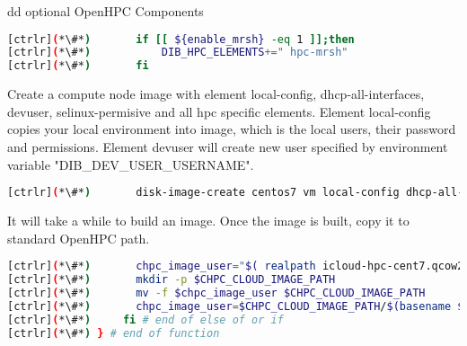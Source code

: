 	dd optional OpenHPC Components


\begin{lstlisting}[language=bash,keywords={}]
[ctrlr](*\#*)       if [[ ${enable_mrsh} -eq 1 ]];then
[ctrlr](*\#*)           DIB_HPC_ELEMENTS+=" hpc-mrsh"
[ctrlr](*\#*)       fi
\end{lstlisting} 

	Create a compute node image with element local-config, dhcp-all-interfaces, devuser, selinux-permisive and all hpc specific elements. Element local-config copies your local environment into image, which is the local users, their password and permissions. Element devuser will create new user specified by environment variable "DIB\_DEV\_USER\_USERNAME". 


\begin{lstlisting}[language=bash,keywords={}]
[ctrlr](*\#*)       disk-image-create centos7 vm local-config dhcp-all-interfaces devuser selinux-permissive $DIB_HPC_ELEMENTS -o icloud-hpc-cent7
\end{lstlisting} 


	It will take a while to build an image. Once the image is built, copy it to standard OpenHPC path.


\begin{lstlisting}[language=bash,keywords={}]
[ctrlr](*\#*)       chpc_image_user="$( realpath icloud-hpc-cent7.qcow2)"
[ctrlr](*\#*)       mkdir -p $CHPC_CLOUD_IMAGE_PATH
[ctrlr](*\#*)       mv -f $chpc_image_user $CHPC_CLOUD_IMAGE_PATH
[ctrlr](*\#*)       chpc_image_user=$CHPC_CLOUD_IMAGE_PATH/$(basename $chpc_image_user)
[ctrlr](*\#*)     fi # end of else of or if
[ctrlr](*\#*) } # end of function
\end{lstlisting} 

